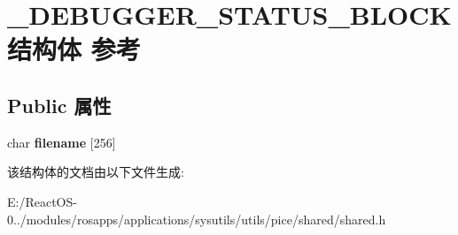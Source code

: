 \hypertarget{struct___d_e_b_u_g_g_e_r___s_t_a_t_u_s___b_l_o_c_k}{}\section{\+\_\+\+D\+E\+B\+U\+G\+G\+E\+R\+\_\+\+S\+T\+A\+T\+U\+S\+\_\+\+B\+L\+O\+C\+K结构体 参考}
\label{struct___d_e_b_u_g_g_e_r___s_t_a_t_u_s___b_l_o_c_k}
\subsection*{Public 属性}
\begin{DoxyCompactItemize}
\item 
\mbox{\label{struct___d_e_b_u_g_g_e_r___s_t_a_t_u_s___b_l_o_c_k_aa28f7e197ef0d6a79ea098fe3761454e}} 
char {\bfseries filename} \mbox{[}256\mbox{]}
\end{DoxyCompactItemize}


该结构体的文档由以下文件生成\+:\begin{DoxyCompactItemize}
\item 
E\+:/\+React\+O\+S-\/0../modules/rosapps/applications/sysutils/utils/pice/shared/shared.\+h\end{DoxyCompactItemize}
